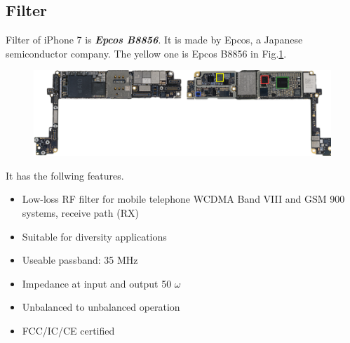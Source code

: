 \documentclass[conference]{IEEEtran}
\begin{document}
\subsection{Filter}
Filter of iPhone 7 is {\bfseries{\emph{Epcos B8856}}}\cite{Ewisetech.org}. It is made by Epcos, a Japanese semiconductor company. The yellow one is Epcos B8856 in Fig.\ref{fig:Power_Management}.

\begin{figure}[!ht]
	\centering
	\begin{center}
		\includegraphics*[width=0.8\linewidth]{pm}
		\caption{}
		\label{fig:Power_Management}
	\end{center}
\end{figure}

It has the follwing features\cite{B8856.org}.
\begin{itemize}
	\item Low-loss RF filter for mobile telephone WCDMA Band VIII and GSM 900 systems, receive path (RX)
	\item Suitable for diversity applications
	\item Useable passband: 35 MHz
	\item Impedance at input and output 50 $\omega$
	\item Unbalanced to unbalanced operation
	\item FCC/IC/CE certified
\end{itemize}
\end{document}
